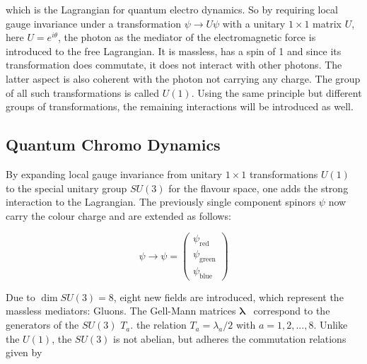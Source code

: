 \noindent which is the Lagrangian for quantum electro dynamics. So by requiring local gauge invariance under a transformation $\psi \rightarrow U \psi$ with a unitary $1 \times 1$ matrix $U$, here $U = e^{i \theta}$, the photon as the mediator of the electromagnetic force is introduced to the free Lagrangian. It is massless, has a spin of 1 and since its transformation does commutate, it does not interact with other photons. The latter aspect is also coherent with the photon not carrying any charge. The group of all such transformations is called $U(1)$. Using the same principle but different groups of transformations, the remaining interactions will be introduced as well.

\subsection{Quantum Chromo Dynamics}
\label{sec:qcd}

By expanding local gauge invariance from unitary $1 \times 1$ transformations $U(1)$ to the special unitary group $SU(3)$ for the flavour space, one adds the strong interaction to the Lagrangian. The previously single component spinors $\psi$ now carry the colour charge and are extended as follows:

\begin{equation}
  \label{eq:colorspinor}
  \psi \rightarrow \psi = \begin{pmatrix}
    \psi_{\text{red}} \\
    \psi_{\text{green}} \\
    \psi_{\text{blue}}
  \end{pmatrix}
\end{equation}



\noindent Due to $\dim{SU(3)} = 8$, eight new fields are introduced, which represent the massless mediators: Gluons. The Gell-Mann matrices $\mathbf{\lambda}$~\cite{gellmann} correspond to the generators of the $SU(3)$ $T_a$. the relation $T_a = \lambda_a / 2$ with $a = 1, 2, ..., 8$. Unlike the $U(1)$, the $SU(3)$ is not abelian, but adheres the commutation relations given by

